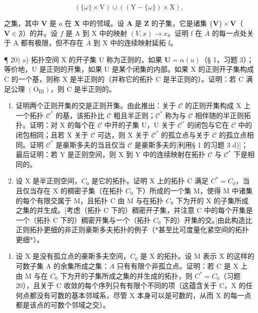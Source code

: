 \[
(\{\omega \} \times \mathrm{V}) \cup ((\mathrm{Y} - \{\omega \}) \times \mathrm{X}),
\]

之集，其中 \(\mathbf{V}\) 是 \(a\) 在 \(\mathbf{X}\) 中的邻域。设 \(\mathbf{A}\) 是 \(\mathbf{Z}\) 的子集，它是诸集 \(\{\mathbf{V}\} \times \mathbf{V}\)（\(\mathbf{V} \in \mathfrak{F}\)）的并。设 \(f\) 是 A 到 X 中的映射 \((V, x) \rightarrow x\)。证明 f 在 \(\overline{A}\) 的每一点处关于 A 都有极限，但不存在 \(\overline{A}\) 到 X 中的连续映射延拓 f。

¶ 20) a) 拓扑空间 X 的开子集 U 称为正则的，如果 \(\mathbf{U} = \alpha(u)\)（§ 1，习题 3）；等价地，U 是正则的开集，如果 U 是某个闭集的内部。如果 X 的正则开子集构成 C 的一个基，则称 X 是半正则的（并称它的拓扑 C 是半正则的）。证明：若 C 满足公理 \((\mathrm{O}_{\mathrm{III}})\)，则 C 是半正则的。

\begin{enumerate}
\def\labelenumi{\alph{enumi})}
\setcounter{enumi}{1}
\item
  证明两个正则开集的交是正则开集。由此推出：关于 \(\mathcal{C}\) 的正则开集构成 X 上一个拓扑 \(\mathcal{C}^*\) 的基，该拓扑比 \(\mathcal{C}\) 粗且半正则；\(\mathcal{C}^*\) 称为与 \(\mathcal{C}\) 相伴随的半正则拓扑。证明：对 X 的每个在 \(\mathcal{C}\) 中开的子集 U，U 关于 \(\mathcal{C}^*\) 的闭包与它在 \(\mathcal{C}\) 中的闭包相同；且若 X 关于 \(\mathcal{C}\) 可达，则 X 关于 \(\mathcal{C}^*\) 的孤立点与关于 \(\mathcal{C}\) 的孤立点相同。证明 \(\mathcal{C}^*\) 是豪斯多夫的当且仅当 \(\mathcal{C}\) 是豪斯多夫的{[}利用§ 1 的习题 3 d){]}；最后证明：若 Y 是正则空间，则 X 到 Y 中的连续映射在拓扑 \(\mathcal{C}\) 与 \(\mathcal{C}^*\) 下是相同的。
\item
  设 X 是半正则空间，\(C_{0}\) 是它的拓扑。证明 X 上的拓扑 C 满足 \(C^{*} = C_{0}\)，当且仅当存在 X 的稠密子集（在拓扑 \(C_{0}\) 下）所成的一个集 M，使得 M 中诸集的每个有限交属于 M，且拓扑 C 由 M 与在拓扑 \(C_{0}\) 下为开的 X 的子集所成之集的并生成。{[}考虑（拓扑 C 下的）稠密开子集，并注意 C 中的每个开集是一个（拓扑 C 下的）稠密开集与一个（拓扑 \(C_{0}\) 下的）开集的交。{]}由此构造比正则拓扑更细的非正则豪斯多夫拓扑的例子（*甚至比可度量化紧空间的拓扑更细*）。
\end{enumerate}

\begin{enumerate}
\def\labelenumi{\arabic{enumi})}
\setcounter{enumi}{20}
\tightlist
\item
  设 X 是没有孤立点的豪斯多夫空间，\(C_{0}\) 是 X 的拓扑。设 M 表示 X 的这样的可数子集 A 的余集所成之集：\(\overline{A}\) 只有有限个非孤立点。证明：若 C 是 X 上由 M 与在 \(C_{0}\) 下为开的子集所成之集的并生成的拓扑，则 \(C^{*} = C_{0}\)（习题 20），且关于 C 收敛的每个序列只有有限个不同的项（这蕴含关于 C，X 的任何点都没有可数的基本邻域系，尽管 X 本身可以是可数的，从而 X 的每一点都是该点的可数个邻域之交）。
\end{enumerate}

